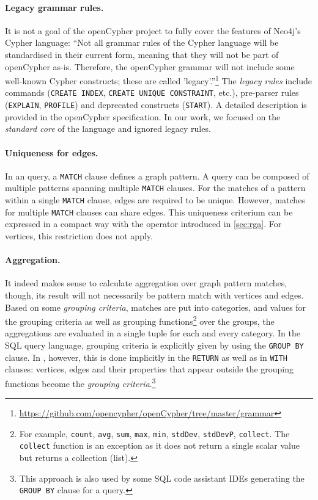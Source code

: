 \paragraph{Legacy grammar rules.} It is not a goal of the openCypher project to fully cover the features of Neo4j's Cypher language: ``Not all grammar rules of the Cypher language will be standardised in their current form, meaning that they will not be part of openCypher as-is. Therefore, the openCypher grammar will not include some well-known Cypher constructs; these are called 'legacy'.''\footnote{\url{https://github.com/opencypher/openCypher/tree/master/grammar}} The \emph{legacy rules} include commands (\lstinline+CREATE INDEX+, \lstinline+CREATE UNIQUE CONSTRAINT+, etc.), pre-parser rules (\lstinline+EXPLAIN+, \lstinline+PROFILE+) and deprecated constructs (\lstinline+START+). A detailed description is provided in the openCypher specification. In our work, we focused on the \emph{standard core} of the language and ignored legacy rules.

\paragraph{Uniqueness for edges.} In an \opencypher query, a \lstinline+MATCH+ clause defines a graph pattern. A query can be composed of multiple patterns spanning multiple \lstinline+MATCH+ clauses. For the matches of a pattern within a single \lstinline+MATCH+ clause, edges are required to be unique. %
However, matches for multiple \lstinline+MATCH+ clauses can share edges. This uniqueness criterium can be expressed in a compact way with the \alldifferenttext operator introduced in \cref{sec:rga}. For vertices, this restriction does not apply.

\paragraph{Aggregation.} It indeed makes sense to calculate aggregation over graph pattern matches, though, its result will not necessarily be pattern match with vertices and edges. Based on some \emph{grouping criteria}, matches are put into categories, and values for the grouping criteria as well as grouping functions\footnote{For example, \lstinline+count+, \lstinline+avg+, \lstinline+sum+, \lstinline+max+, \lstinline+min+, \lstinline+stdDev+, \lstinline+stdDevP+, \lstinline+collect+. The \lstinline+collect+ function is an exception as it does not return a single scalar value but returns a collection (list).} over the groups, the aggregations are evaluated in a single tuple for each and every category. In the SQL query language, grouping criteria is explicitly given by using the \lstinline+GROUP BY+ clause. In \opencypher, however, this is done implicitly in the \lstinline+RETURN+ as well as in \lstinline+WITH+ clauses: vertices, edges and their properties that appear outside the grouping functions become the \emph{grouping criteria}.\footnote{This approach is also used by some SQL code assistant IDEs generating the \lstinline+GROUP BY+ clause for a query.}

